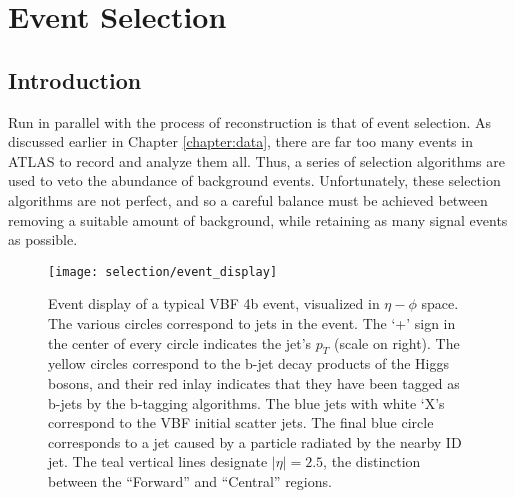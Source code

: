 \chapter{Event Selection} \label{chapter:selection}

\section{Introduction}

    Run in parallel with the process of reconstruction is that of event selection.
    As discussed earlier in Chapter \ref{chapter:data},
        there are far too many events in ATLAS to record and analyze them all.
    Thus, a series of selection algorithms are used to veto the abundance of background events.
    Unfortunately, these selection algorithms are not perfect,
        and so a careful balance must be achieved between removing a suitable amount of background,
        while retaining as many signal events as possible.

    \begin{figure}[tbh]
        \texttt{[image: selection/event\_display]}
        \caption{
            Event display of a typical VBF \to 4b event, visualized in $\eta-\phi$ space.
            The various circles correspond to jets in the event.
            The `+' sign in the center of every circle indicates the jet's $p_T$ (scale on right).
            The yellow circles correspond to the b-jet decay products of the Higgs bosons,
                and their red inlay indicates that they have been tagged as b-jets by the b-tagging algorithms.
            The blue jets with white `X's correspond to the VBF initial scatter jets.
            The final blue circle corresponds to a jet caused by a particle radiated by the nearby ID jet.
            The teal vertical lines designate $|\eta|=2.5$,
                the distinction between the ``Forward'' and ``Central'' regions.
        }
        \label{fig:event_display}
    \end{figure}

